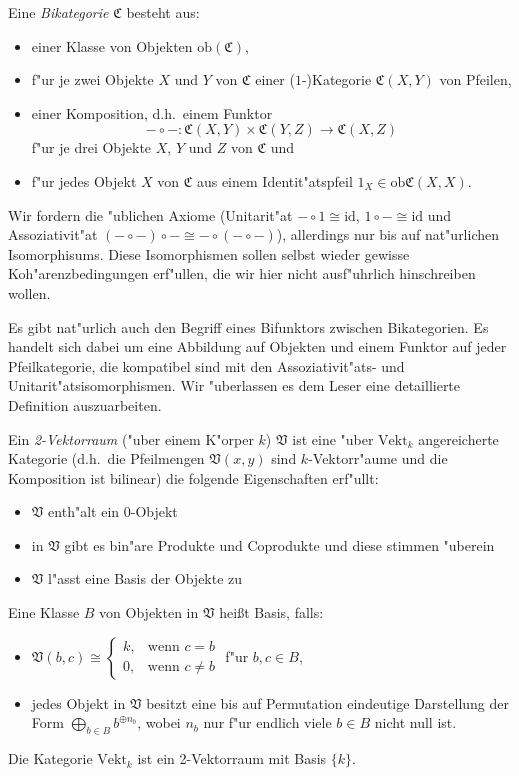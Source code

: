 \begin{Def}
Eine \emph{Bikategorie} $\mathfrak C$ besteht aus:
\begin{itemize}
\item einer Klasse von Objekten $\mathrm{ob}(\mathfrak C)$,
\item f"ur je zwei Objekte $X$ und $Y$ von $\mathfrak C$ einer ($1$-)Kategorie $\mathfrak{C}(X,Y)$ von Pfeilen,
\item einer Komposition, d.h.\ einem Funktor \[-\circ-\colon \mathfrak{C}(X,Y)\times \mathfrak{C}(Y,Z)\longrightarrow\mathfrak{C}(X,Z)\]
f"ur je drei Objekte $X$, $Y$ und $Z$ von $\mathfrak C$ und
\item f"ur jedes Objekt $X$ von $\mathfrak C$ aus einem Identit"atspfeil $1_X\in \mathrm{ob}\mathfrak C(X,X)$.%
\end{itemize}
Wir fordern die "ublichen Axiome (Unitarit"at $-\circ 1\cong \mathrm{id}$, $1\circ -\cong \mathrm{id}$ und Assoziativit"at $(-\circ-)\circ-\cong -\circ(-\circ-)$), allerdings nur bis auf nat"urlichen Isomorphisums. Diese Isomorphismen sollen selbst wieder gewisse Koh"arenzbedingungen erf"ullen, die wir hier nicht ausf"uhrlich hinschreiben wollen.
\end{Def}
Es gibt nat"urlich auch den Begriff eines Bifunktors zwischen Bikategorien. Es handelt sich dabei um eine Abbildung auf Objekten und einem Funktor auf jeder Pfeilkategorie, die kompatibel sind mit den Assoziativit"ats- und Unitarit"atsisomorphismen. Wir "uberlassen es dem Leser eine detaillierte Definition auszuarbeiten.

\begin{Def}
Ein \emph{2-Vektorraum} ("uber einem K"orper $k$) $\mathfrak V$ ist eine "uber $\mathrm{Vekt}_k$ angereicherte Kategorie (d.h.\ die Pfeilmengen $\mathfrak V(x,y)$ sind $k$-Vektorr"aume und die Komposition ist bilinear) die folgende Eigenschaften erf"ullt:
\begin{itemize}
\item $\mathfrak V$ enth"alt ein $0$-Objekt
\item in $\mathfrak V$ gibt es bin"are Produkte und Coprodukte und diese stimmen "uberein
\item $\mathfrak V$ l"asst eine Basis der Objekte zu
\end{itemize}
Eine Klasse $B$ von Objekten in $\mathfrak V$ hei\ss t Basis, falls:
\begin{itemize}
\item $\mathfrak V(b,c) \cong\begin{cases}
  k,  & \text{wenn }c=b\\
  0, & \text{wenn }c\neq b
\end{cases}$ f"ur $b,c \in B$,
\item jedes Objekt in $\mathfrak V$ besitzt eine bis auf Permutation eindeutige Darstellung der Form $\bigoplus\limits_{b\in B} b^{\oplus n_b}$, wobei $n_b$ nur f"ur endlich viele $b\in B$ nicht null ist.
\end{itemize}
\end{Def}

\begin{Bsp}
Die Kategorie $\mathrm{Vekt}_k$ ist ein 2-Vektorraum mit Basis $\{k\}$.
\end{Bsp}
